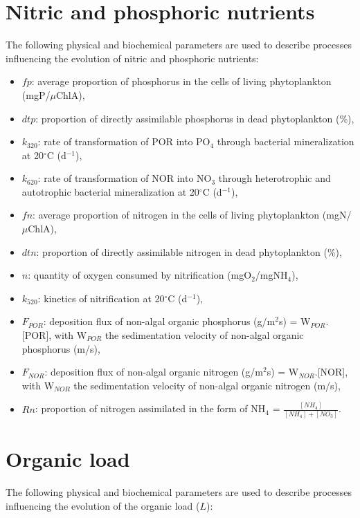 \section{Nitric and phosphoric nutrients}

The following physical and biochemical parameters are used to describe processes
influencing the evolution of nitric and phosphoric nutrients:

\begin{itemize}
\item $fp$: average proportion of phosphorus in the cells of living phytoplankton (mgP/$\mu$ChlA),
\item $dtp$: proportion of directly assimilable phosphorus in dead phytoplankton ($\%$),
\item $k_{320}$: rate of transformation of POR into PO$_4$ through bacterial mineralization
  at 20$^{\circ}$C (d$^{-1}$),
\item $k_{620}$: rate of transformation of NOR into NO$_3$ through heterotrophic and autotrophic
  bacterial mineralization at 20$^{\circ}$C (d$^{-1}$),
\item $fn$: average proportion of nitrogen in the cells of living phytoplankton (mgN/$\mu$ChlA),
\item $dtn$: proportion of directly assimilable nitrogen in dead phytoplankton ($\%$),
\item $n$: quantity of oxygen consumed by nitrification (mgO$_2$/mgNH$_4$),
\item $k_{520}$: kinetics of nitrification at 20$^{\circ}$C (d$^{-1}$),
\item $F_{POR}$: deposition flux of non-algal organic phosphorus (g/m$^2$s) = W$_{POR}$.[POR],
  with W$_{POR}$ the sedimentation velocity of non-algal organic phosphorus (m/s),
\item $F_{NOR}$: deposition flux of non-algal organic nitrogen (g/m$^2$s) = W$_{NOR}$.[NOR],
  with W$_{NOR}$ the sedimentation velocity of non-algal organic nitrogen (m/s),
\item $Rn$: proportion of nitrogen assimilated in the form of NH$_4$ = $\frac{[NH_4]}{[NH_4]+[NO_3]}$.
\end{itemize}

\section{Organic load}

The following physical and biochemical parameters are used to describe processes
influencing the evolution of the organic load ($L$):

